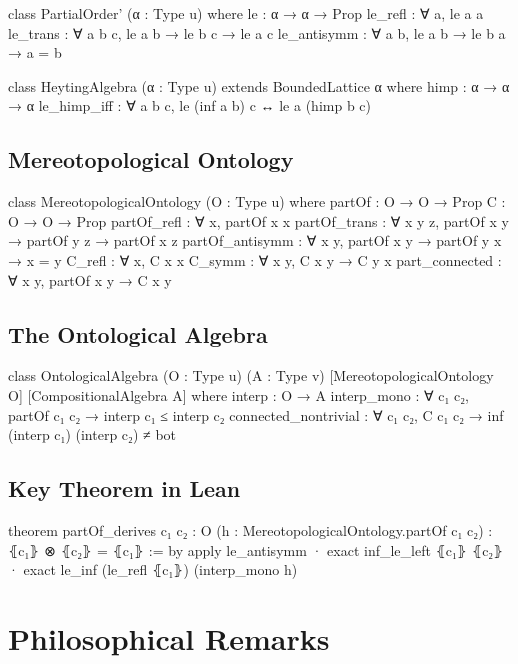 \documentclass[12pt,a4paper]{article}
\theoremstyle{definition}
\theoremstyle{plain}
\theoremstyle{remark}
\begin{document}
\begin{leancode}
class PartialOrder' (α : Type u) where
  le : α → α → Prop
  le_refl : ∀ a, le a a
  le_trans : ∀ {a b c}, le a b → le b c → le a c
  le_antisymm : ∀ {a b}, le a b → le b a → a = b

class HeytingAlgebra (α : Type u) extends BoundedLattice α where
  himp : α → α → α
  le_himp_iff : ∀ {a b c}, le (inf a b) c ↔ le a (himp b c)
\end{leancode}

\subsection{Mereotopological Ontology}

\begin{leancode}
class MereotopologicalOntology (O : Type u) where
  partOf : O → O → Prop
  C : O → O → Prop
  partOf_refl : ∀ x, partOf x x
  partOf_trans : ∀ {x y z}, partOf x y → partOf y z → partOf x z
  partOf_antisymm : ∀ {x y}, partOf x y → partOf y x → x = y
  C_refl : ∀ x, C x x
  C_symm : ∀ {x y}, C x y → C y x
  part_connected : ∀ {x y}, partOf x y → C x y
\end{leancode}

\subsection{The Ontological Algebra}

\begin{leancode}
class OntologicalAlgebra (O : Type u) (A : Type v)
    [MereotopologicalOntology O] [CompositionalAlgebra A] where
  interp : O → A
  interp_mono : ∀ {c₁ c₂}, partOf c₁ c₂ → interp c₁ ≤ interp c₂
  connected_nontrivial : ∀ {c₁ c₂}, C c₁ c₂ → 
    inf (interp c₁) (interp c₂) ≠ bot
\end{leancode}

\subsection{Key Theorem in Lean}

\begin{leancode}
theorem partOf_derives {c₁ c₂ : O}
    (h : MereotopologicalOntology.partOf c₁ c₂) :
    ⦃c₁⦄ ⊗ ⦃c₂⦄ = ⦃c₁⦄ := by
  apply le_antisymm
  · exact inf_le_left ⦃c₁⦄ ⦃c₂⦄
  · exact le_inf (le_refl ⦃c₁⦄) (interp_mono h)
\end{leancode}

\section{Philosophical Remarks}
\end{document}

